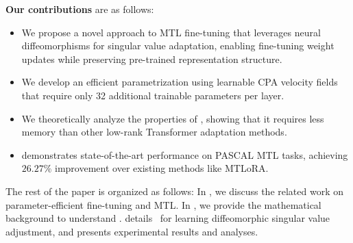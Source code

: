 \noindent
\textbf{Our contributions} are as follows:
\begin{itemize}
    \item We propose a novel approach to MTL fine-tuning that leverages neural diffeomorphisms for singular value adaptation, enabling fine-tuning weight updates while preserving pre-trained representation structure.
    
    \item We develop an efficient parametrization using learnable CPA velocity fields that require only 32 additional trainable parameters per layer.

    \item We theoretically analyze the properties of \ourmethod{}, showing that it requires less memory than other low-rank Transformer adaptation methods.
    
    \item \ourmethod{} demonstrates state-of-the-art performance on PASCAL MTL tasks, achieving \(26.27\%\) improvement over existing methods like MTLoRA. 
\end{itemize}
The rest of the paper is organized as follows: In , we discuss the related work on parameter-efficient fine-tuning and MTL. In , we provide the mathematical background to understand \ourmethod{}.  details \ourmethod\, for learning diffeomorphic  singular value adjustment, and  presents experimental results and analyses. 